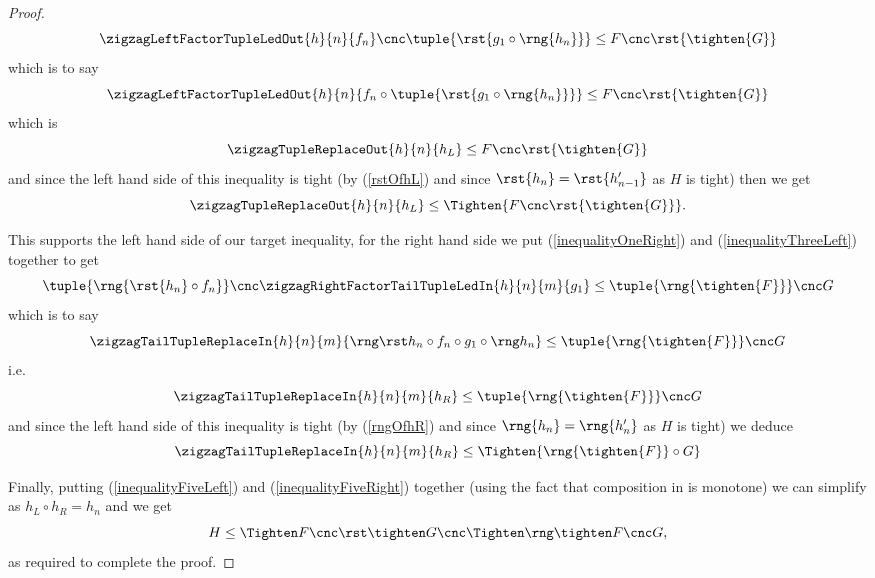 \begin{proof}
\[
\zigzagLeftFactorTupleLedOut{h}{n}{f_n} 
          \cnc \tuple{\rst{ g_1 \circ \rng{h_n}}}
              \leq F \cnc \rst{\tighten{G}}
\]
which is to say
\[
\zigzagLeftFactorTupleLedOut{h}{n}
        {f_n \circ \tuple{\rst{ g_1 \circ \rng{h_n}}}}
              \leq F \cnc \rst{\tighten{G}}
\]
which is 
\begin{equation}
\label{inequalityFourLeftRewrittenAgain}
\zigzagTupleReplaceOut{h}{n}
        {h_L}
              \leq F \cnc \rst{\tighten{G}}
\end{equation}
and since the left hand side of this inequality is tight
(by (\ref{rstOfhL}) and since $\rst{h_n} = \rst{h'_{n-1}}$
 as $H$ is tight)
then we get
\begin{equation}
\label{inequalityFiveLeft}
\zigzagTupleReplaceOut{h}{n}
        {h_L}
              \leq \Tighten{F \cnc \rst{\tighten{G}}}.
\end{equation}

This supports the left hand side of our target inequality, for the right hand side we
put (\ref{inequalityOneRight}) 
and (\ref{inequalityThreeLeft}) together to get
\[
\tuple{\rng{\rst{h_n} \circ f_n}} \cnc \zigzagRightFactorTailTupleLedIn{h}{n}{m}{g_1} 
       \leq \tuple{\rng{\tighten{F}}} \cnc G
\]
which is to say
\[
\zigzagTailTupleReplaceIn{h}{n}{m}{\hR} 
       \leq \tuple{\rng{\tighten{F}}} \cnc G 
\]
i.e.
\[
\zigzagTailTupleReplaceIn{h}{n}{m}{h_R} 
        \leq  \tuple{\rng{\tighten{F}}} \cnc G 
\]
and since the left hand side of this inequality is tight
(by (\ref{rngOfhR}) and since $\rng{h_n} = \rng{h'_n}$
 as $H$ is tight)  we deduce
\begin{equation}
\label{inequalityFiveRight}
\zigzagTailTupleReplaceIn{h}{n}{m}
                {h_R} 
                 \leq  \Tighten{ \rng{\tighten{F}} \circ G}
\end{equation}

Finally, putting (\ref{inequalityFiveLeft}) 
and (\ref{inequalityFiveRight}) together
(using the fact that
 composition in \catcw is monotone)
we can  simplify as  $h_L \circ h_R = h_n$ and we get 
\[
H \leq \theTightening,
\]
as required to complete the proof.
\end{proof}

\newcommand{\tightCncTightLeft}[2]{\tighten{#1 \cnc \rst{#2}}}
\newcommand{\tightCncTightRight}[2]{\tighten{\rng{#1} \cnc #2}}
\newcommand{\tightCncTight}[2]
       {\tightCncTightLeft{#1}{#2} \cnc \tightCncTightRight{#1}{#2}}

\newcommand{\tightFcncG}{\tightCncTight{F}{G}}

